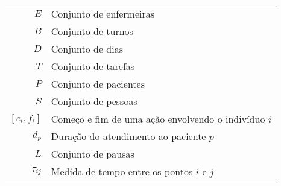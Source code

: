 
\begin{tabular}{rl}
$E$ & Conjunto de enfermeiras \\
$B$ & Conjunto de turnos \\
$D$ & Conjunto de dias \\
$T$ & Conjunto de tarefas \\
$P$ & Conjunto de pacientes \\
$S$ & Conjunto de pessoas \\
$[c_i,f_i]$ & Começo e fim de uma aç\~ ao envolvendo o indiv\'iduo $i$ \\
$d_p$ & Duraç\~ao do atendimento ao paciente $p$ \\
$L$ & Conjunto de pausas \\ 
$\tau_{ij}$ & Medida de tempo entre os pontos $i$ e $j$
\end{tabular}